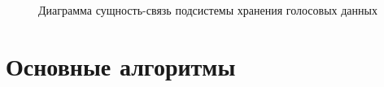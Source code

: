 \begin{figure}
    
    \caption{Диаграмма сущность-связь подсистемы хранения голосовых данных}
    \label{fig:er_main}
\end{figure}


\section{Основные алгоритмы}

